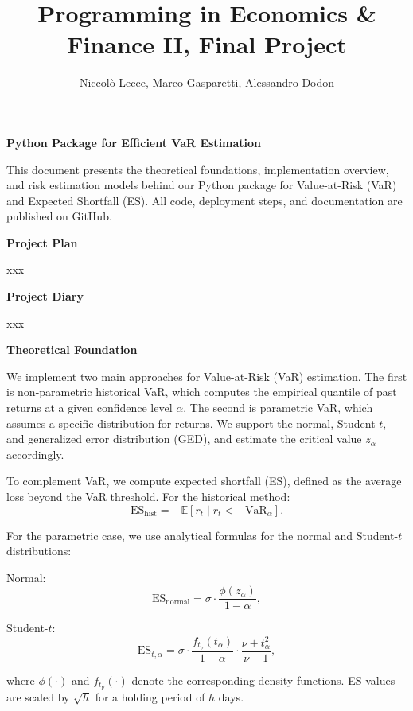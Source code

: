 \documentclass[12pt]{article}
\title{\textbf{\huge Programming in Economics \& Finance II, Final Project}}
\author{Niccol\`o Lecce, Marco Gasparetti, Alessandro Dodon}
\date{}
\begin{document}
\maketitle

\textbf{Python Package for Efficient VaR Estimation}

This document presents the theoretical foundations, implementation overview, and risk estimation models behind our Python package for Value-at-Risk (VaR) and Expected Shortfall (ES). All code, deployment steps, and documentation are published on GitHub.


\textbf{Project Plan}

xxx


\textbf{Project Diary}

xxx


\textbf{Theoretical Foundation}

\vspace{1em}
\underline{}

\vspace{0.6em}

We implement two main approaches for Value-at-Risk (VaR) estimation. The first is non-parametric historical VaR, which computes the empirical quantile of past returns at a given confidence level $\alpha$. The second is parametric VaR, which assumes a specific distribution for returns. We support the normal, Student-$t$, and generalized error distribution (GED), and estimate the critical value $z_\alpha$ accordingly.

To complement VaR, we compute expected shortfall (ES), defined as the average loss beyond the VaR threshold. For the historical method:
\[
\text{ES}_{\mathrm{hist}} = -\mathbb{E}[r_t \mid r_t < -\text{VaR}_\alpha].
\]

For the parametric case, we use analytical formulas for the normal and Student-$t$ distributions:

Normal:
\[
\text{ES}_{\mathrm{normal}} = \sigma \cdot \frac{\phi(z_\alpha)}{1 - \alpha},
\]

Student-$t$:
\[
\text{ES}_{t,\alpha} = \sigma \cdot \frac{f_{t_\nu}(t_\alpha)}{1 - \alpha} \cdot \frac{\nu + t_\alpha^2}{\nu - 1},
\]

where $\phi(\cdot)$ and $f_{t_\nu}(\cdot)$ denote the corresponding density functions. ES values are scaled by $\sqrt{h}$ for a holding period of $h$ days.
\end{document}
